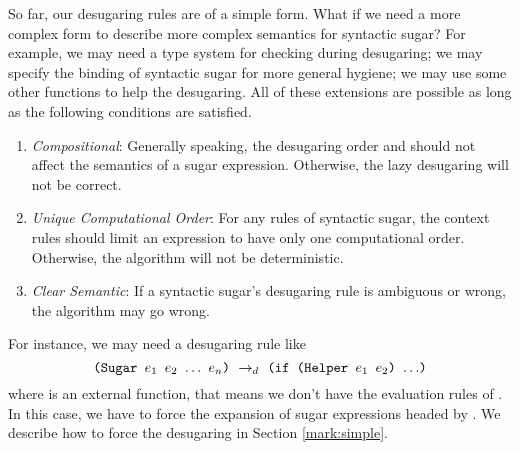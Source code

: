So far, our desugaring rules are of a simple form. What if we need a more complex form to describe more complex semantics for syntactic sugar? For example, we may need a type system for checking during desugaring; we may specify the binding of syntactic sugar for more general hygiene; we may use some other functions to help the desugaring. All of these extensions are possible as long as the following conditions are satisfied.
\begin{enumerate}
	\item \emph{Compositional}: Generally speaking, the desugaring order and should not affect the semantics of a sugar expression. Otherwise, the lazy desugaring will not be correct.
	\item \emph{Unique Computational Order}: For any rules of syntactic sugar, the context rules should limit an expression to have only one computational order. Otherwise, the algorithm  will not be deterministic.
	\item \emph{Clear Semantic}: If a syntactic sugar's desugaring rule is ambiguous or wrong, the algorithm  may go wrong.
\end{enumerate}

For instance, we may need a desugaring rule like
\[
\texttt{(Sugar $e_1$ $e_2$ $\ldots$ $e_n$)} ~\rightarrow_d~ \texttt{(if (Helper $e_1$ $e_2$) $\ldots$)}
\]
where  is an external function, that means we don't have the evaluation rules of . In this case, we have to force the expansion of sugar expressions headed by . We describe how to force the desugaring in Section \ref{mark:simple}.




